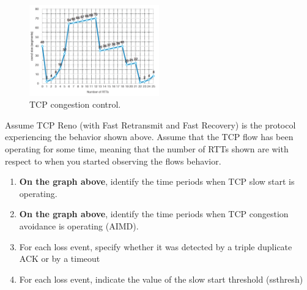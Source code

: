 \documentclass{report}
\begin{document}
\clearpage
\begin{problem}

\begin{figure}[!ht]
	\centering
	\includegraphics[width=0.5\textwidth]{image2.png}
	\caption{TCP congestion control.}
	\centering
	\label{fig:image2}
\end{figure}

Assume TCP Reno (with Fast Retransmit and Fast Recovery) is the protocol
experiencing the behavior shown above. Assume that the TCP flow has been
operating for some time, meaning that the number of RTTs shown are with respect
to when you started observing the flows behavior.

\begin{enumerate}
\item \textbf{On the graph above}, identify the time periods when TCP slow start
      is operating.
\item \textbf{On the graph above}, identify the time periods when TCP congestion
      avoidance is operating (AIMD).
\item For each loss event, specify whether it was detected by a triple duplicate
      ACK or by a timeout
\item For each loss event, indicate the value of the slow start threshold (ssthresh)
\end{enumerate}


\end{problem}
\end{document}
